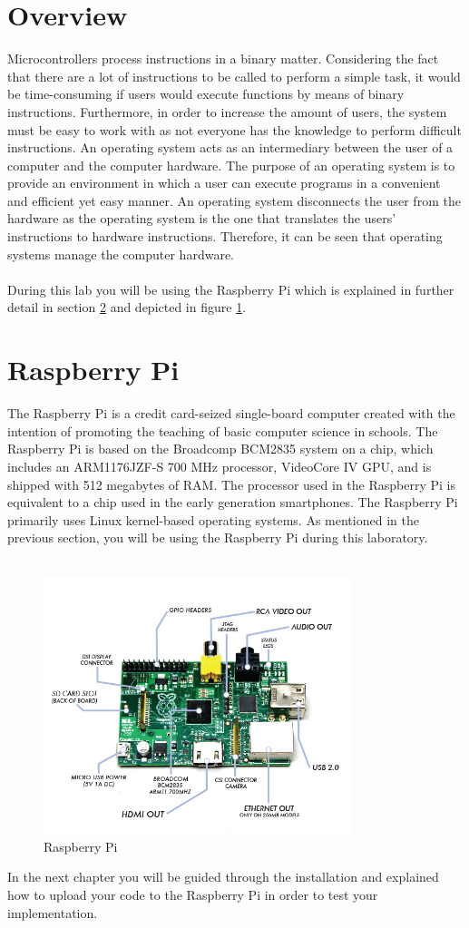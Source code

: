 \section{Overview}\label{sec:overview}
Microcontrollers process instructions in a binary matter. Considering the fact that there are a lot of instructions to be called to perform a simple task, it would be time-consuming if users would execute functions by means of binary instructions. Furthermore, in order to increase the amount of users, the system must be easy to work with as not everyone has the knowledge to perform difficult instructions. An operating system acts as an intermediary between the user of a computer and the computer hardware. The purpose of an operating system is to provide an environment in which a user can execute programs in a convenient and efficient yet easy manner. An operating system disconnects the user from the hardware as the operating system is the one that translates the users' instructions to hardware instructions. Therefore, it can be seen that operating systems manage the computer hardware.\\
\\
During this lab you will be using the Raspberry Pi which is explained in further detail in section \ref{sec:raspberry} and depicted in figure \ref{fig:raspberry}.

\section{Raspberry Pi}\label{sec:raspberry}
The Raspberry Pi is a credit card-seized single-board computer created with the intention of promoting the teaching of basic computer science in schools. The Raspberry Pi is based on the Broadcomp BCM2835 system on a chip, which includes an ARM1176JZF-S 700 MHz processor, VideoCore IV GPU, and is shipped with 512 megabytes of RAM. The processor used in the Raspberry Pi is equivalent to a chip used in the early generation smartphones. The Raspberry Pi primarily uses Linux kernel-based operating systems. As mentioned in the previous section, you will be using the Raspberry Pi during this laboratory.\\
\\
\begin{figure}[!htbp]
	\centering
		\includegraphics[width=0.80\textwidth]{images/raspberry.jpg}
	\caption{Raspberry Pi}
	\label{fig:raspberry}
\end{figure}

In the next chapter you will be guided through the installation and explained how to upload your code to the Raspberry Pi in order to test your implementation.\\ 

